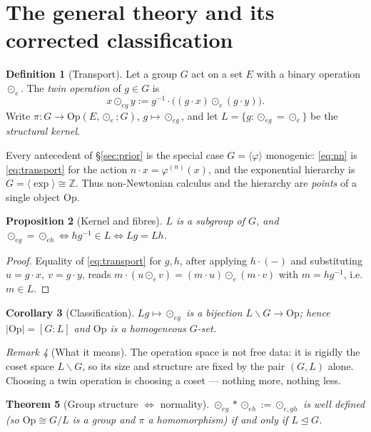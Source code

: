 \documentclass[11pt,a4paper]{article}
\newcommand{\Op}{\mathrm{Op}}
\newcommand{\Z}{\mathbb{Z}}
\theoremstyle{plain}
\newtheorem{theorem}{Theorem}
\newtheorem{proposition}[theorem]{Proposition}
\newtheorem{corollary}[theorem]{Corollary}
\theoremstyle{definition}
\newtheorem{definition}[theorem]{Definition}
\theoremstyle{remark}
\newtheorem{remark}[theorem]{Remark}
\begin{document}
\section{The general theory and its corrected classification}
\label{sec:theory}

\begin{definition}[Transport]
Let a group $G$ act on a set $E$ with a binary operation $\odot_e$. The
\emph{twin operation} of $g\in G$ is
\begin{equation}\label{eq:transport}
x\odot_{eg}y:=g^{-1}\cdot\bigl((g\cdot x)\odot_e(g\cdot y)\bigr).
\end{equation}
Write $\pi:G\to\Op(E,\odot_e;G)$, $g\mapsto\odot_{eg}$, and let
$L=\{g:\odot_{eg}=\odot_e\}$ be the \emph{structural kernel}.
\end{definition}

Every antecedent of \S\ref{sec:prior} is the special case
$G=\langle\varphi\rangle$ monogenic: \eqref{eq:nn} is \eqref{eq:transport} for
the action $n\cdot x=\varphi^{(n)}(x)$, and the exponential hierarchy is
$G=\langle\exp\rangle\cong\Z$. Thus non-Newtonian calculus and the hierarchy are
\emph{points} of a single object $\Op$.

\begin{proposition}[Kernel and fibres]\label{prop:fibres}
$L$ is a subgroup of $G$, and
$\odot_{eg}=\odot_{eh}\iff hg^{-1}\in L\iff Lg=Lh$.
\end{proposition}

\begin{proof}
Equality of \eqref{eq:transport} for $g,h$, after applying $h\cdot(-)$ and
substituting $u=g\cdot x,\ v=g\cdot y$, reads $m\cdot(u\odot_e v)=(m\cdot
u)\odot_e(m\cdot v)$ with $m=hg^{-1}$, i.e. $m\in L$.
\end{proof}

\begin{corollary}[Classification]\label{cor:class}
$Lg\mapsto\odot_{eg}$ is a bijection $L\backslash G\to\Op$; hence
$|\Op|=[G:L]$ and $\Op$ is a homogeneous $G$-set.
\end{corollary}

\begin{remark}[What it means]
The operation space is not free data: it is rigidly the coset space
$L\backslash G$, so its size and structure are fixed by the pair $(G,L)$ alone.
Choosing a twin operation is choosing a coset --- nothing more, nothing less.
\end{remark}

\begin{theorem}[Group structure $\iff$ normality]\label{thm:normal}
$\odot_{eg}\ast\odot_{eh}:=\odot_{e,gh}$ is well defined (so $\Op\cong G/L$ is a
group and $\pi$ a homomorphism) if and only if $L\trianglelefteq G$.
\end{theorem}
\end{document}
